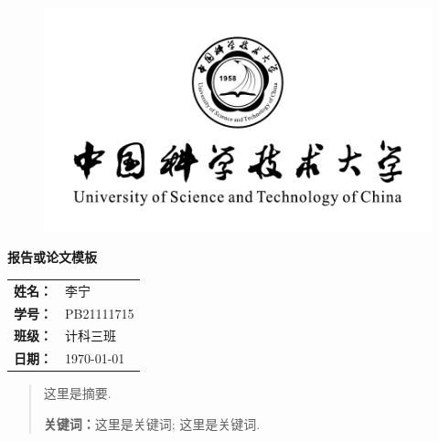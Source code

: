 \documentclass[12pt, a4paper, oneside]{ctexart}
\begin{document}
\thispagestyle{empty}

\vspace*{2cm}

\begin{figure}
    \centering
    \includegraphics[width = 13cm]{logo.pdf}
\end{figure}

\begin{center}
    \Huge\textbf{报告或论文模板}
\end{center}

\vspace*{5cm}

\begin{table}[htpb]
    \centering
    \large
    \begin{tabular}{ll}
        \textbf{姓名：} & 李宁 \\
        \textbf{学号：} & PB21111715 \\
        \textbf{班级：} & 计科三班 \\
        \textbf{日期：} & \today \\
    \end{tabular}    
\end{table}

\newpage
\setcounter{page}{0}
\thispagestyle{empty}
\vspace*{1cm}
\renewcommand{\abstractname}{\Large\textbf{摘要}}
\begin{abstract}
    \vspace*{0.5cm}
    这里是摘要. 
    \vspace*{0.5cm}
    \par\textbf{关键词：}这里是关键词; 这里是关键词. 
\end{abstract}

\newpage
{}
\setcounter{page}{1}
\tableofcontents
\end{document}

